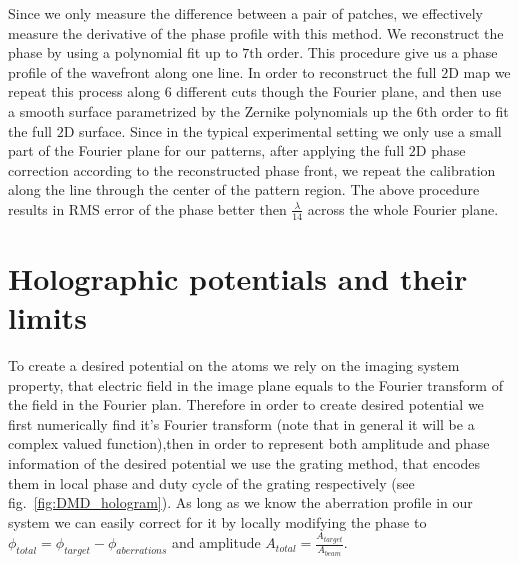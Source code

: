 Since we only measure the difference between a pair of patches, we effectively measure the derivative of the phase profile with this method. We reconstruct the phase by using a polynomial fit up to $7\mathrm{th}$ order. This procedure give us a phase profile of the wavefront along one line. In order to reconstruct the full $2\mathrm{D}$ map we repeat this process along 6 different cuts though the Fourier plane, and then use a smooth surface parametrized by the Zernike polynomials up the $6\mathrm{th}$ order to fit the full $2\mathrm{D}$ surface. Since in the typical experimental setting we only use a small part of the Fourier plane for our patterns, after applying the full $2\mathrm{D}$ phase correction according to the reconstructed phase front, we repeat the calibration along the line through the center of the pattern region. The above procedure results in RMS error of the phase better then $\frac{\lambda}{14}$ across the whole Fourier plane.

\section{Holographic potentials and their limits}
To create a desired potential on the atoms we rely on the imaging system property, that electric field in the image plane equals to the Fourier transform of the field in the Fourier plan. Therefore in order to create desired potential we first numerically find it's Fourier transform (note that in general it will be a complex valued function),then in order to represent both amplitude and phase information of the desired potential we use the grating method, that encodes them in local phase and duty cycle of the grating respectively (see fig.~\ref{fig:DMD_hologram}). As long as we know the aberration profile in our system we can easily correct for it by locally modifying the phase to $\phi_{total} = \phi_{target} - \phi_{aberrations}$ and amplitude $A_{total} = \frac{A_{target}}{A_{beam}}$.

